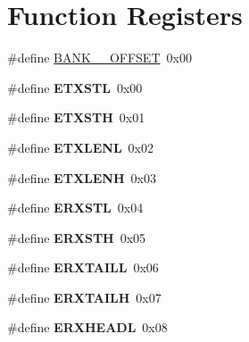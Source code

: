 \hypertarget{group___special}{}\section{Function Registers}
\label{group___special}
\begin{DoxyCompactItemize}
\item 
\#define \mbox{\hyperlink{group___special_ga66d34711bf1b18dddae4db092c250451}{B\+A\+N\+K\+\_\+\_\+\+O\+F\+F\+S\+ET}}~0x00
\item 
\mbox{\label{group___special_ga45a38712c4d618bb5cb013e3d781db46}} 
\#define {\bfseries E\+T\+X\+S\+TL}~0x00
\item 
\mbox{\label{group___special_gadfc695618aa5a32160cc9e2b0234c714}} 
\#define {\bfseries E\+T\+X\+S\+TH}~0x01
\item 
\mbox{\label{group___special_gaabce294609dfd914fcc09bbe4c4dcf75}} 
\#define {\bfseries E\+T\+X\+L\+E\+NL}~0x02
\item 
\mbox{\label{group___special_ga0b19f954414d0b99eac5e44f9f6b7ffd}} 
\#define {\bfseries E\+T\+X\+L\+E\+NH}~0x03
\item 
\mbox{\label{group___special_ga387e1ac675539e1c0c7f158f59eafd51}} 
\#define {\bfseries E\+R\+X\+S\+TL}~0x04
\item 
\mbox{\label{group___special_gad4c2a40d74ded1e155f7eb18effb76ba}} 
\#define {\bfseries E\+R\+X\+S\+TH}~0x05
\item 
\mbox{\label{group___special_gaf3b3b39a7b4d282655be48a7d6644b16}} 
\#define {\bfseries E\+R\+X\+T\+A\+I\+LL}~0x06
\item 
\mbox{\label{group___special_ga5dc63cf151dc56e1c6dffbac3e33a6b9}} 
\#define {\bfseries E\+R\+X\+T\+A\+I\+LH}~0x07
\item 
\mbox{\label{group___special_gae2bce69021e980e000c605b1c891a957}} 
\#define {\bfseries E\+R\+X\+H\+E\+A\+DL}~0x08
\item 
\mbox{\label{group___special_ga1ed2ae5dd309b9fb325be27aec0d5da4}} 

\end{DoxyCompactItemize}
